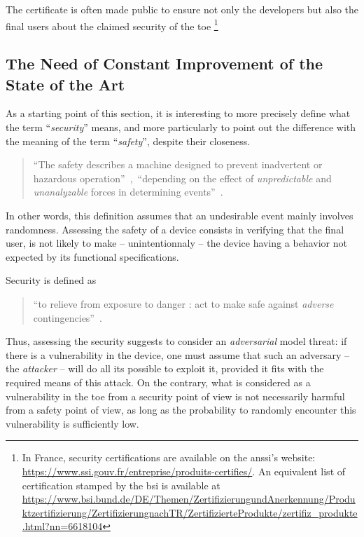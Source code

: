 \begin{itemize}
	The certificate is often made public to ensure not only the developers but also the final users about the claimed security of the \gls{toe}%
	\footnote{
		In France, security certifications are available on the \gls{anssi}'s website: \url{https://www.ssi.gouv.fr/entreprise/produits-certifies/}.
		An equivalent list of certification stamped by the \gls{bsi} is available at \url{https://www.bsi.bund.de/DE/Themen/ZertifizierungundAnerkennung/Produktzertifizierung/ZertifizierungnachTR/ZertifizierteProdukte/zertifiz_produkte.html?nn=6618104}
	}
\end{itemize}

\subsection{The Need of Constant Improvement of the State of the Art}
As a starting point of this section, it is interesting to more precisely define what the term ``\emph{security}'' means, and more particularly to point out the difference with the meaning of the term ``\emph{safety}'', despite their closeness.
\begin{quote}
	``The safety describes a machine designed to prevent inadvertent or hazardous operation''~\cite{mw:safety}, \ie{}\,``depending on the effect of \emph{unpredictable} and \emph{unanalyzable} forces in determining events''~\cite{mw:hazardous}.
\end{quote}
In other words, this definition assumes that an undesirable event mainly involves randomness.
Assessing the safety of a device consists in verifying that the final user, is not likely to make -- unintentionnaly -- the device having a behavior not expected by its functional specifications. 

Security is defined as 
\begin{quote}
	``to relieve from exposure to danger : act to make safe against \emph{adverse} contingencies''~\cite{mw:security}.
\end{quote}
Thus, assessing the security suggests to consider an \emph{adversarial} model threat: if there is a vulnerability in the device, one must assume that such an adversary -- \aka{} the \emph{attacker} -- will do all its possible to exploit it, provided it fits with the required means of this attack.
On the contrary, what is considered as a vulnerability in the \gls{toe} from a security point of view is not necessarily harmful from a safety point of view, as long as the probability to randomly encounter this vulnerability is sufficiently low.

